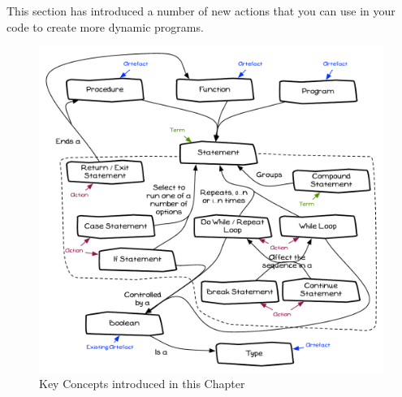 This section has introduced a number of new actions that you can use in your code to create more dynamic programs. 

\begin{figure}[h]
   \centering
   \includegraphics[width=\textwidth]{./topics/control-flow/diagrams/Summary} 
   \caption[Chapter Concepts]{Key Concepts introduced in this Chapter}
   \label{fig:control-flow-summary}
\end{figure}


